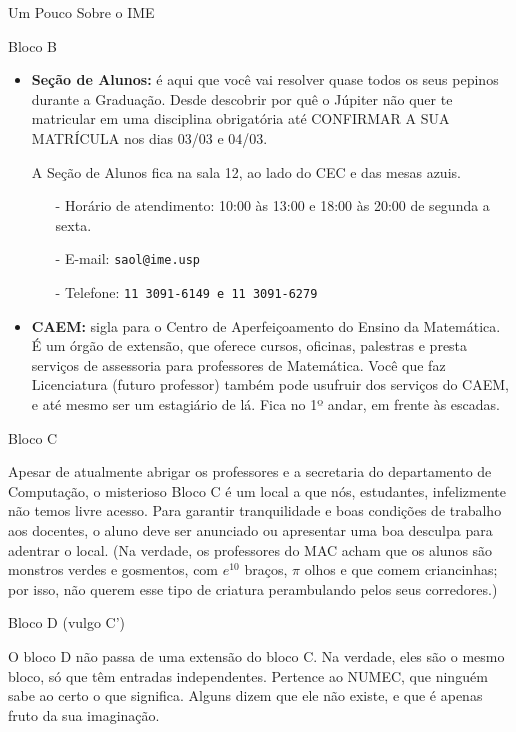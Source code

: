 \begin{secao}{Um Pouco Sobre o IME}
\begin{subsecao}{Bloco B}
\begin{itemize}
\item {\bf Seção de Alunos:} é aqui que você vai resolver quase todos os seus
 pepinos durante a Graduação. Desde descobrir por quê o Júpiter não quer te matricular
em uma disciplina obrigatória até CONFIRMAR A SUA MATRÍCULA nos dias 03/03 e 04/03. %

A Seção de Alunos fica na sala 12, ao lado do CEC e das mesas azuis.
\begin{itemize}
\item[-] Horário de atendimento: 10:00 às 13:00 e 18:00 às 20:00 de segunda a sexta.
\item[-] E-mail: \tt{saol@ime.usp}
\item[-] Telefone: \tt{11 3091-6149} e \tt{11 3091-6279}
\end{itemize}

\item {\bf CAEM:} sigla para o Centro de Aperfeiçoamento do Ensino da Matemática.
É um órgão de extensão, que oferece cursos, oficinas, palestras e presta serviços
de assessoria para professores de Matemática. Você que faz Licenciatura (futuro professor) também pode usufruir dos serviços do CAEM, e até mesmo ser um
estagiário de lá. Fica no 1º andar, em frente às escadas.

\end{itemize}
\end{subsecao}

\begin{subsecao}{Bloco C}

Apesar de atualmente abrigar os professores e a secretaria do departamento de
Computação, o misterioso Bloco C é um local a que nós, estudantes, infelizmente não
temos livre acesso. Para garantir tranquilidade e boas condições de trabalho aos
docentes, o aluno deve ser anunciado ou apresentar uma boa desculpa para adentrar
o local. (Na verdade, os professores do MAC acham que os alunos são monstros
verdes e gosmentos, com $e^{10}$ braços, $\pi$ olhos e que comem criancinhas;
por isso, não querem esse tipo de criatura perambulando pelos seus corredores.)

\end{subsecao}

\begin{subsecao}{Bloco D (vulgo C')}

O bloco D não passa de uma extensão do bloco C. Na verdade, eles são o mesmo bloco,
só que têm entradas independentes. Pertence ao NUMEC, que ninguém sabe ao certo
o que significa. Alguns dizem que ele não existe, e que é apenas fruto da sua
imaginação.


\end{subsecao}
\end{secao}

